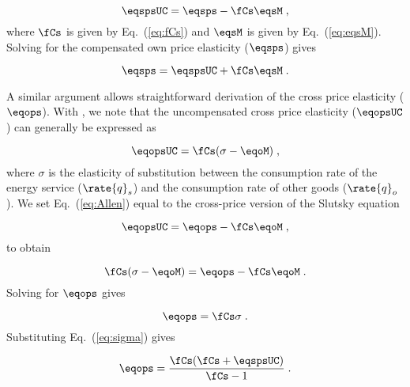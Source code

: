 \begin{equation} \label{eq:slutsky}
  \eqspsUC = \eqsps - \fCs \eqsM \; ,
\end{equation}
%
where $\fCs$ is given by Eq.~(\ref{eq:fCs}) and 
$\eqsM$ is given by Eq.~(\ref{eq:eqsM}).
Solving for the compensated own price elasticity ($\eqsps$) gives

\begin{equation} \label{eq:eqsps}
  \eqsps = \eqspsUC + \fCs \eqsM \; .
\end{equation}

A similar argument allows straightforward derivation 
of the cross price elasticity ($\eqops$).
With \citet{Hicks1934}, 
we note that the uncompensated cross price elasticity ($\eqopsUC$)
can generally be expressed as

\begin{equation} \label{eq:Allen}
  \eqopsUC = \fCs (\sigma - \eqoM) \; ,
\end{equation}
%
where $\sigma$ is the elasticity of substitution 
between the consumption rate of the energy service ($\rate{q}_s$) and
the consumption rate of other goods ($\rate{q}_o$). 
We set Eq.~(\ref{eq:Allen}) equal to 
the cross-price version of the Slutsky equation

\begin{equation} \label{eq:slutsky_cross}
  \eqopsUC = \eqops - \fCs \eqoM \; ,
\end{equation}
%
to obtain

\begin{equation}
  \fCs (\sigma - \eqoM) = \eqops - \fCs \eqoM \; .
\end{equation}
%
Solving for $\eqops$ gives

\begin{equation} \label{eq:eqops_general}
  \eqops = \fCs \sigma \; .
\end{equation}
%
Substituting Eq.~(\ref{eq:sigma}) gives

\begin{equation} \label{eq:eqops}
  \eqops = \frac{\fCs (\fCs + \eqspsUC)}{\fCs - 1} \; .
\end{equation}









